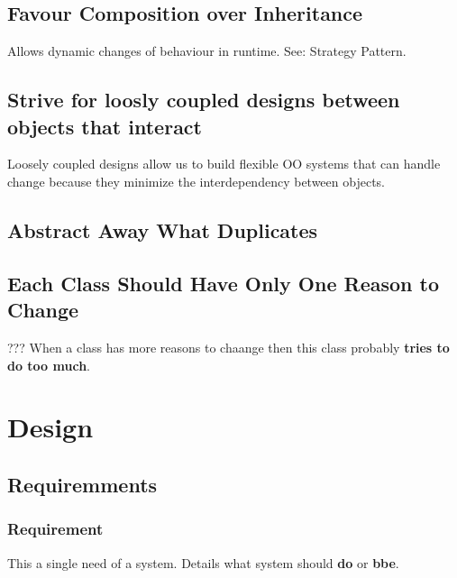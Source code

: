 \documentclass{report}
\begin{document}
\chapter{Favour Composition over Inheritance}
Allows dynamic changes of behaviour in runtime. See: Strategy Pattern.



\chapter{Strive for loosly coupled designs between objects that interact}
Loosely coupled designs allow us to build flexible OO systems that can handle change 
because they minimize the interdependency between objects.



\chapter{Abstract Away What Duplicates}



\chapter{Each Class Should Have Only One Reason to Change}
??? When a class has more reasons to chaange then this class probably
\textbf{tries to do too much}.




\part{Design}



\chapter{Requiremments}


\section{Requirement}
This a single need of a system. Details what system should \textbf{do} or
\textbf{bbe}.
\end{document}
